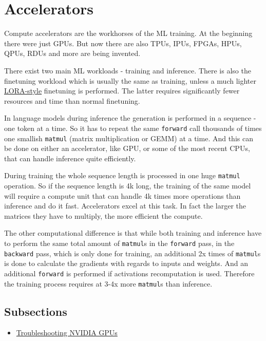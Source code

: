\documentclass[
]{report}
\author{}
\date{2024-02-20}
\providecommand{\tightlist}{%
  \setlength{\itemsep}{0pt}\setlength{\parskip}{0pt}}\usepackage{longtable,booktabs,array}
\begin{document}
\chapter{Accelerators}\label{accelerators}

Compute accelerators are the workhorses of the ML training. At the
beginning there were just GPUs. But now there are also TPUs, IPUs,
FPGAs, HPUs, QPUs, RDUs and more are being invented.

There exist two main ML workloads - training and inference. There is
also the finetuning workload which is usually the same as training,
unless a much lighter
\href{https://arxiv.org/abs/2106.09685}{LORA-style} finetuning is
performed. The latter requires significantly fewer resources and time
than normal finetuning.

In language models during inference the generation is performed in a
sequence - one token at a time. So it has to repeat the same
\texttt{forward} call thousands of times one smallish \texttt{matmul}
(matrix multiplication or GEMM) at a time. And this can be done on
either an accelerator, like GPU, or some of the most recent CPUs, that
can handle inference quite efficiently.

During training the whole sequence length is processed in one huge
\texttt{matmul} operation. So if the sequence length is 4k long, the
training of the same model will require a compute unit that can handle
4k times more operations than inference and do it fast. Accelerators
excel at this task. In fact the larger the matrices they have to
multiply, the more efficient the compute.

The other computational difference is that while both training and
inference have to perform the same total amount of \texttt{matmul}s in
the \texttt{forward} pass, in the \texttt{backward} pass, which is only
done for training, an additional 2x times of \texttt{matmul}s is done to
calculate the gradients with regards to inputs and weights. And an
additional \texttt{forward} is performed if activations recomputation is
used. Therefore the training process requires at 3-4x more
\texttt{matmul}s than inference.

\section{Subsections}\label{subsections}

\begin{itemize}
\tightlist
\item
  \href{./nvidia/debug.qmd}{Troubleshooting NVIDIA GPUs}
\end{itemize}
\end{document}
